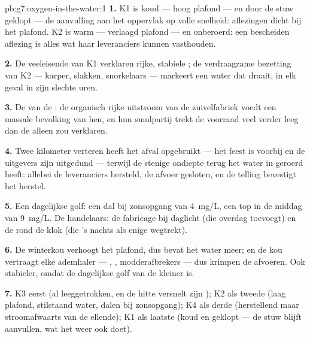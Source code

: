 \begin{solution}{pb:g7:oxygen-in-the-water:1}
\textbf{1.} K1 is koud --- hoog plafond --- en door de stuw geklopt --- de
aanvulling aan het oppervlak op volle snelheid: aflezingen dicht bij het
plafond. K2 is warm --- verlaagd plafond --- en onberoerd: een bescheiden
aflezing is alles wat haar leveranciers kunnen vasthouden.

\textbf{2.} De veeleisende  van K1 verklaren rijke, stabiele
; de verdraagzame bezetting van K2 --- karper, slakken,
snorkelaars --- markeert een water dat  draait, in elk geval in zijn
slechte uren.

\textbf{3.} De  van de : de organisch rijke uitstroom
van de zuivelfabriek voedt een massale bevolking van hen, en hun
smulpartij trekt de voorraad veel verder leeg dan de  alleen
zou verklaren.

\textbf{4.} Twee kilometer verteren heeft het afval opgebruikt --- het
feest is voorbij en de uitgevers zijn uitgedund --- terwijl de stenige
ondiepte  terug het water in geroerd heeft: allebei de
leveranciers hersteld, de afvoer gesloten, en de telling bevestigt het
herstel.

\textbf{5.} Een dagelijkse golf: een dal bij zonsopgang van
\qty{4}{mg/L}, een top in de middag van \qty{9}{mg/L}. De handelaars:
de fabricage bij daglicht (die overdag toevoegt) en de  rond de
klok (die 's nachts als enige wegtrekt).

\textbf{6.} De winterkou verhoogt het plafond, dus bevat het water meer;
en de kou vertraagt elke ademhaler --- , , modderafbrekers
--- dus krimpen de afvoeren. Ook stabieler, omdat de dagelijkse golf van
de  kleiner is.

\textbf{7.} K3 eerst (al leeggetrokken, en de hitte versnelt zijn
); K2 als tweede (laag plafond, stilstaand water, dalen bij
zonsopgang); K4 als derde (herstellend maar stroomafwaarts van de
ellende); K1 als laatste (koud en geklopt --- de stuw blijft aanvullen,
wat het weer ook doet).


\end{solution}
